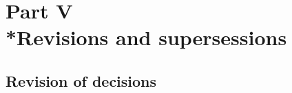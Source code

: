 \documentclass[a4paper,12pt]{article}
\begin{document}
%
%
%
%

\section[Part V --- Revisions and supersessions]{Part V\\*Revisions and supersessions}

\renewcommand\parthead{--- Part V}


\subsection[17. Revision of decisions]{Revision of decisions}
\end{document}
